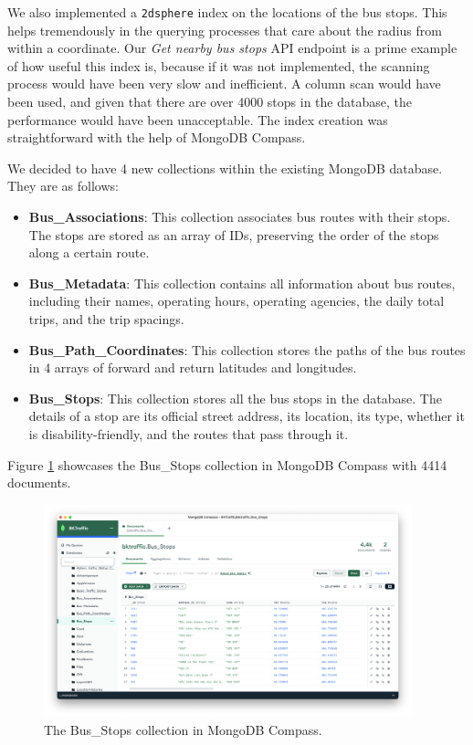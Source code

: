 We also implemented a \lstinline{2dsphere} index on the locations of the bus stops. This helps tremendously in the querying processes that care about the radius from within a coordinate. Our \textit{Get nearby bus stops} API endpoint is a prime example of how useful this index is, because if it was not implemented, the scanning process would have been very slow and inefficient. A column scan would have been used, and given that there are over 4000 stops in the database, the performance would have been unacceptable. The index creation was straightforward with the help of MongoDB Compass.

We decided to have 4 new collections within the existing MongoDB database. They are as follows:
\begin{itemize}
    \item \textbf{Bus\_Associations}: This collection associates bus routes with their stops. The stops are stored as an array of IDs, preserving the order of the stops along a certain route.
    \item \textbf{Bus\_Metadata}: This collection contains all information about bus routes, including their names, operating hours, operating agencies, the daily total trips, and the trip spacings.
    \item \textbf{Bus\_Path\_Coordinates}: This collection stores the paths of the bus routes in 4 arrays of forward and return latitudes and longitudes.
    \item \textbf{Bus\_Stops}: This collection stores all the bus stops in the database. The details of a stop are its official street address, its location, its type, whether it is disability-friendly, and the routes that pass through it.
\end{itemize}

Figure \ref{fig:dbcompass} showcases the Bus\_Stops collection in MongoDB Compass with 4414 documents.

\begin{figure}[H]
    \centering
    \includegraphics[width=0.95\textwidth]{assets/images/Implementation/db_compass.png}
    \caption{The Bus\_Stops collection in MongoDB Compass.}
    \label{fig:dbcompass}
\end{figure}


